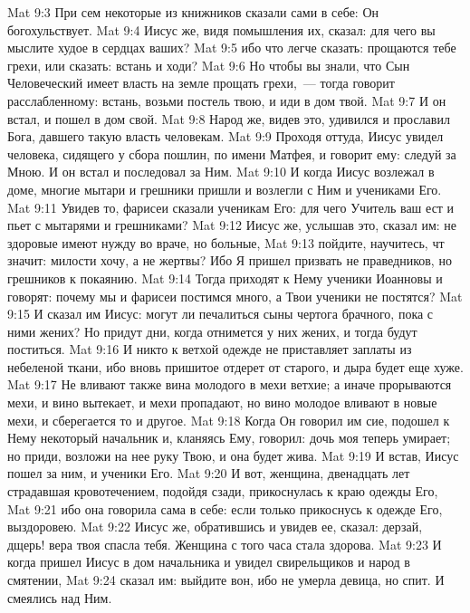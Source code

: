 \vs Mat 9:3 При сем некоторые из книжников сказали сами в себе: Он богохульствует.
\vs Mat 9:4 Иисус же, видя помышления их, сказал: для чего вы мыслите худое в сердцах ваших?
\vs Mat 9:5 ибо что легче сказать: прощаются тебе грехи, или сказать: встань и ходи?
\vs Mat 9:6 Но чтобы вы знали, что Сын Человеческий имеет власть на земле прощать грехи,~--- тогда говорит расслабленному: встань, возьми постель твою, и иди в дом твой.
\vs Mat 9:7 И он встал,  и пошел в дом свой.
\vs Mat 9:8 Народ же, видев это, удивился и прославил Бога, давшего такую власть человекам.
\rsbpar\vs Mat 9:9 Проходя оттуда, Иисус увидел человека, сидящего у сбора пошлин, по имени Матфея, и говорит ему: следуй за Мною. И он встал и последовал за Ним.
\vs Mat 9:10 И когда Иисус возлежал в доме, многие мытари и грешники пришли и возлегли с Ним и учениками Его.
\vs Mat 9:11 Увидев то, фарисеи сказали ученикам Его: для чего Учитель ваш ест и пьет с мытарями и грешниками?
\vs Mat 9:12 Иисус же, услышав это, сказал им: не здоровые имеют нужду во враче, но больные,
\vs Mat 9:13 пойдите, научитесь, чт значит: милости хочу, а не жертвы? Ибо Я пришел призвать не праведников, но грешников к покаянию.
\rsbpar\vs Mat 9:14 Тогда приходят к Нему ученики Иоанновы и говорят: почему мы и фарисеи постимся много, а Твои ученики не постятся?
\vs Mat 9:15 И сказал им Иисус: могут ли печалиться сыны чертога брачного, пока с ними жених? Но придут дни, когда отнимется у них жених, и тогда будут поститься.
\vs Mat 9:16 И никто к ветхой одежде не приставляет заплаты из небеленой ткани, ибо вновь пришитое отдерет от старого, и дыра будет еще хуже.
\vs Mat 9:17 Не вливают также вина молодого в мехи ветхие; а иначе прорываются мехи, и вино вытекает, и мехи пропадают, но вино молодое вливают в новые мехи, и сберегается то и другое.
\rsbpar\vs Mat 9:18 Когда Он говорил им сие, подошел к Нему некоторый начальник и, кланяясь Ему, говорил: дочь моя теперь умирает; но приди, возложи на нее руку Твою, и она будет жива.
\vs Mat 9:19 И встав, Иисус пошел за ним, и ученики Его.
\rsbpar\vs Mat 9:20 И вот, женщина, двенадцать лет страдавшая кровотечением, подойдя сзади, прикоснулась к краю одежды Его,
\vs Mat 9:21 ибо она говорила сама в себе: если только прикоснусь к одежде Его, выздоровею.
\vs Mat 9:22 Иисус же, обратившись и увидев ее, сказал: дерзай, дщерь! вера твоя спасла тебя. Женщина с того часа стала здорова.
\rsbpar\vs Mat 9:23 И когда пришел Иисус в дом начальника и увидел свирельщиков и народ в смятении,
\vs Mat 9:24 сказал им: выйдите вон, ибо не умерла девица, но спит. И смеялись над Ним.
